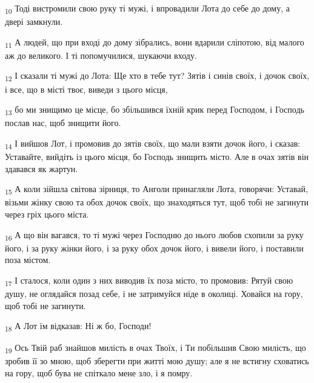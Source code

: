 \begin{tcolorbox}
\textsubscript{10} Тоді вистромили свою руку ті мужі, і впровадили Лота до себе до дому, а двері замкнули.
\end{tcolorbox}
\begin{tcolorbox}
\textsubscript{11} А людей, що при вході до дому зібрались, вони вдарили сліпотою, від малого аж до великого. І ті попомучилися, шукаючи входу.
\end{tcolorbox}
\begin{tcolorbox}
\textsubscript{12} І сказали ті мужі до Лота: Ще хто в тебе тут? Зятів і синів своїх, і дочок своїх, і все, що в місті твоє, виведи з цього місця,
\end{tcolorbox}
\begin{tcolorbox}
\textsubscript{13} бо ми знищимо це місце, бо збільшився їхній крик перед Господом, і Господь послав нас, щоб знищити його.
\end{tcolorbox}
\begin{tcolorbox}
\textsubscript{14} І вийшов Лот, і промовив до зятів своїх, що мали взяти дочок його, і сказав: Уставайте, вийдіть із цього місця, бо Господь знищить місто. Але в очах зятів він здавався як жартун.
\end{tcolorbox}
\begin{tcolorbox}
\textsubscript{15} А коли зійшла світова зірниця, то Анголи принагляли Лота, говорячи: Уставай, візьми жінку свою та обох дочок своїх, що знаходяться тут, щоб тобі не загинути через гріх цього міста.
\end{tcolorbox}
\begin{tcolorbox}
\textsubscript{16} А що він вагався, то ті мужі через Господню до нього любов схопили за руку його, і за руку жінки його, і за руку обох дочок його, і вивели його, і поставили поза містом.
\end{tcolorbox}
\begin{tcolorbox}
\textsubscript{17} І сталося, коли один з них виводив їх поза місто, то промовив: Рятуй свою душу, не оглядайся позад себе, і не затримуйся ніде в околиці. Ховайся на гору, щоб тобі не загинути.
\end{tcolorbox}
\begin{tcolorbox}
\textsubscript{18} А Лот їм відказав: Ні ж бо, Господи!
\end{tcolorbox}
\begin{tcolorbox}
\textsubscript{19} Ось Твій раб знайшов милість в очах Твоїх, і Ти побільшив Свою милість, що зробив її зо мною, щоб зберегти при житті мою душу; але я не встигну сховатись на гору, щоб бува не спіткало мене зло, і я помру.
\end{tcolorbox}
